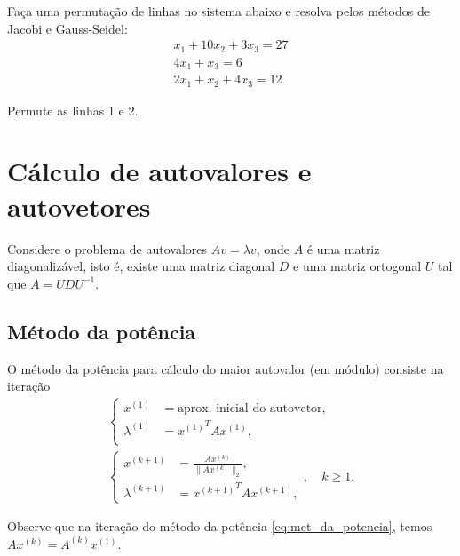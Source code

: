 \begin{exer} Faça uma permutação de linhas no sistema abaixo e resolva pelos métodos de Jacobi e Gauss-Seidel:
\begin{eqnarray*}
x_1+10x_2+3x_3=27\\
4x_1+x_3=6\\
2x_1+x_2+4x_3=12
\end{eqnarray*}
\end{exer}
\begin{resp}

    Permute as linhas 1 e 2.

\end{resp}


\section{Cálculo de autovalores e autovetores}

Considere o problema de autovalores $Av=\lambda v$, onde $A$ é uma matriz diagonalizável, isto é, existe uma matriz diagonal $D$ e uma matriz ortogonal $U$ tal que $A=UDU^{-1}$.

\subsection{Método da potência}

O método da potência para cálculo do maior autovalor (em módulo) consiste na iteração
\begin{equation}\label{eq:met_da_potencia}
\begin{array}{l}
  \left\{\begin{array}{ll}
    \displaystyle x^{(1)} &=\text{aprox. inicial do autovetor},\\
    \displaystyle \lambda^{(1)} &= {x^{(1)}}^T A x^{(1)},\\
  \end{array}\right.\\
  \left\{
  \begin{array}{ll}
    \displaystyle x^{(k+1)} &= \frac{Ax^{(k)}}{\|Ax^{(k)}\|_2},\\
    \displaystyle \lambda^{(k+1)} &= {x^{(k+1)}}^T A x^{(k+1)},
  \end{array}\right.,\quad k\geq 1.
  \end{array}
\end{equation}

\begin{obs}
  Observe que na iteração do método da potência \eqref{eq:met_da_potencia}, temos $Ax^{(k)} = A^{(k)}x^{(1)}$.
\end{obs}

